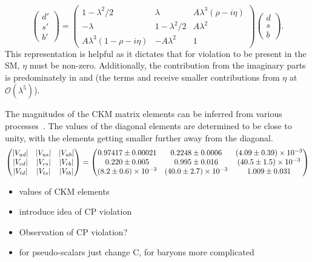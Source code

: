 \begin{equation}
\left( \begin{array}{c} d' \\ s'  \\ b' \end{array} \right) = \begin{pmatrix} 1 - \lambda^2/2 & \lambda & A\lambda^3(\rho-i\eta) \\ -\lambda & 1-\lambda^2/2 & A\lambda^2  \\ A\lambda^3(1-\rho-i\eta) & -A\lambda^2 & 1 \end{pmatrix} \left( \begin{array}{c} d \\ s  \\ b \end{array} \right).
\end{equation}
This representation is helpful as it dictates that for \CP violation to be present in the SM, $\eta$ must be non-zero. Additionally, the contribution from the imaginary parts is predominately in \Vub and \Vtd (the terms \Vcd and \Vts receive smaller contributions from $\eta$ at $\mathcal{O}(\lambda^{5})$). 

The magnitudes of the CKM matrix elements can be inferred from various processes~\cite{PDG2016}. The values of the diagonal elements are determined to be close to unity, with the elements getting smaller further away from the diagonal.
\begin{equation} 
    \begin{pmatrix} 
        |{V_{{u}{d}}}| & |{V_{{u}{s}}}| & |{V_{{u}{b}}}| \\ 
        |{V_{{c}{d}}}| & |{V_{{c}{s}}}| & |{V_{{c}{b}}}|  \\
        |{V_{{t}{d}}}| & |{V_{{t}{s}}}| & |{V_{{t}{b}}}| 
    \end{pmatrix}
    =
    \begin{pmatrix} 
        0.97417\pm0.00021        & 0.2248\pm0.0006           & (4.09\pm0.39)\times10^{-3}\\ 
        0.220\pm0.005            & 0.995\pm0.016             & (40.5\pm1.5)\times10^{-3} \\
        (8.2\pm0.6)\times10^{-3} & (40.0\pm2.7)\times10^{-3} & 1.009\pm0.031            
    \end{pmatrix}
\end{equation}





{\color{Red}
\begin{itemize}
\item values of CKM elements
\item introduce idea of CP violation
\item Observation of CP violation? 
\item for pseudo-scalars just change C, for baryons more complicated
\end{itemize}}

